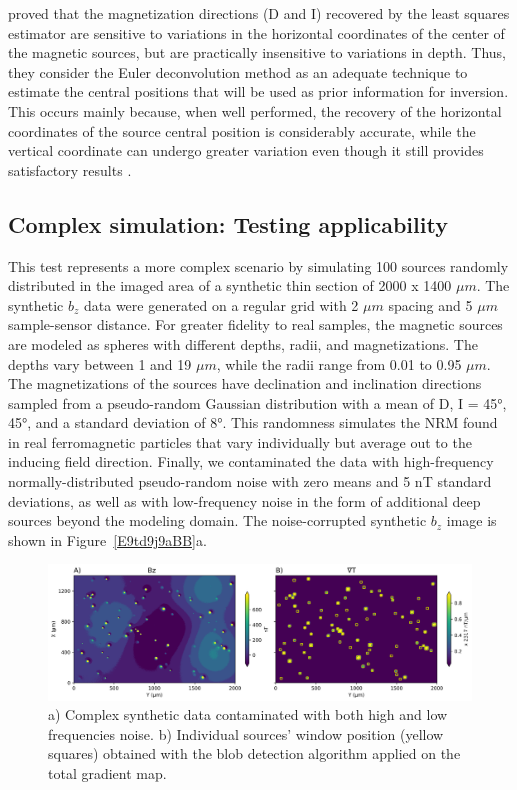 \citet{Oliveira2015Estimation} proved that the magnetization directions (D and
I) recovered by the least squares estimator are sensitive to variations in the
horizontal coordinates of the center of the magnetic sources, but are
practically insensitive to variations in depth. Thus, they consider the Euler
deconvolution method as an adequate technique to estimate the central positions
that will be used as prior information for inversion. This occurs mainly
because, when well performed, the recovery of the horizontal coordinates of the
source central position is considerably accurate, while the vertical coordinate
can undergo greater variation even though it still provides satisfactory
results \citep{Silva20033D, Melo2013}.


\subsection{Complex simulation: Testing applicability}

This test represents a more complex scenario by simulating 100 sources randomly
distributed in the imaged area of a synthetic thin section of 2000 x 1400 $\mu
m$. The synthetic $b_z$ data were generated on a regular grid with 2 $\mu m$
spacing and 5 $\mu m$ sample-sensor distance. For greater fidelity to real
samples, the magnetic sources are modeled as spheres with different depths,
radii, and magnetizations. The depths vary between 1 and 19 $\mu m$, while the
radii range from 0.01 to 0.95 $\mu m$. The magnetizations of the sources have
declination and inclination directions sampled from a pseudo-random Gaussian
distribution with a mean of D, I = 45°, 45°, and a standard deviation of 8°.
This randomness simulates the NRM found in real ferromagnetic particles that
vary individually but average out to the inducing field direction. Finally, we
contaminated the data with high-frequency normally-distributed pseudo-random
noise with zero means and 5 nT standard deviations, as well as with
low-frequency noise in the form of additional deep sources beyond the modeling
domain. The noise-corrupted synthetic $b_z$ image is shown in
Figure~\ref{E9td9j9aBB}a.

\begin{figure}[t]
  \centering
  \includegraphics[width=1\linewidth]{figures/ComplexSynthetic.png}
  \caption{
    a) Complex synthetic data contaminated with  both high and low frequencies noise. b) Individual sources' window position (yellow squares) obtained with the blob detection algorithm applied on the total gradient map.
  }
  \label{e9td9j9abb}
\end{figure}

